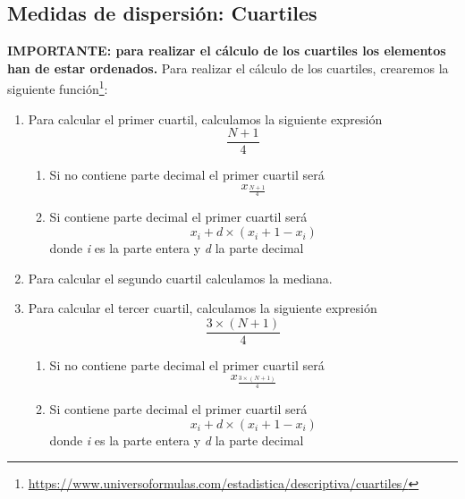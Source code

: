 \documentclass [a4paper] {article}
\begin{document}
\subsection{Medidas de dispersión: Cuartiles}
\textbf{IMPORTANTE: para realizar el cálculo de los cuartiles los elementos han de estar ordenados.}
Para realizar el cálculo de los cuartiles, crearemos la siguiente función\footnote{\url{https://www.universoformulas.com/estadistica/descriptiva/cuartiles/}}:
\begin{enumerate}
	\item Para calcular el primer cuartil, calculamos la siguiente expresión \begin{equation} \frac{N+1}{4} \end{equation}
		\begin{enumerate}
			\item Si no contiene parte decimal el primer cuartil será \begin{equation} x_\frac{N+1}{4} \end{equation}
			\item Si contiene parte decimal el primer cuartil será \begin{equation} x_i + d\times(x_i+1 - x_i) \end{equation} donde \textit{i} es la parte entera y \textit{d} la parte decimal
		\end{enumerate}
	\item Para calcular el segundo cuartil calculamos la mediana.
	\item Para calcular el tercer cuartil, calculamos la siguiente expresión \begin{equation} \frac{3\times(N+1)}{4} \end{equation}
		\begin{enumerate}
			\item Si no contiene parte decimal el primer cuartil será \begin{equation}  x_\frac{3\times(N+1)}{4} \end{equation}
			\item Si contiene parte decimal el primer cuartil será \begin{equation} x_i + d\times(x_i+1 - x_i) \end{equation} donde \textit{i} es la parte entera y \textit{d} la parte decimal
		\end{enumerate}
\end{enumerate}
\end{document}
